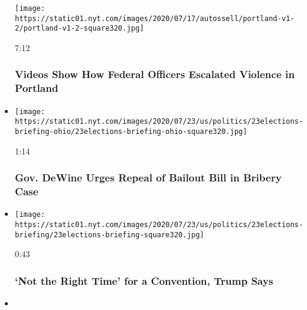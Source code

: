 \begin{itemize}
  \texttt{[image: https://static01.nyt.com/images/2020/07/17/autossell/portland-v1-2/portland-v1-2-square320.jpg]}

  7:12

  \hypertarget{videos-show-how-federal-officers-escalated-violence-in-portland}{%
  \subsubsection{Videos Show How Federal Officers Escalated Violence in
  Portland}\label{videos-show-how-federal-officers-escalated-violence-in-portland}}
\item
  \href{https://www.nytimes.com/video/us/100000007253892/mike-dewine-repeal-law-bribery-case.html?action=click\&module=video-series-bar\&region=header\&pgtype=Article\&playlistId=video/us-politics}{}

  \texttt{[image: https://static01.nyt.com/images/2020/07/23/us/politics/23elections-briefing-ohio/23elections-briefing-ohio-square320.jpg]}

  1:14

  \hypertarget{gov-dewine-urges-repeal-of-bailout-bill-in-bribery-case}{%
  \subsubsection{Gov. DeWine Urges Repeal of Bailout Bill in Bribery
  Case}\label{gov-dewine-urges-repeal-of-bailout-bill-in-bribery-case}}
\item
  \href{https://www.nytimes.com/video/us/100000007253968/trump-cancels-gop-convention.html?action=click\&module=video-series-bar\&region=header\&pgtype=Article\&playlistId=video/us-politics}{}

  \texttt{[image: https://static01.nyt.com/images/2020/07/23/us/politics/23elections-briefing/23elections-briefing-square320.jpg]}

  0:43

  \hypertarget{not-the-right-time-for-a-convention-trump-says}{%
  \subsubsection{`Not the Right Time' for a Convention, Trump
  Says}\label{not-the-right-time-for-a-convention-trump-says}}
\item
  \href{https://www.nytimes.com/video/us/100000007253391/aoc-confronts-yoho.html?action=click\&module=video-series-bar\&region=header\&pgtype=Article\&playlistId=video/us-politics}{}


\end{itemize}
